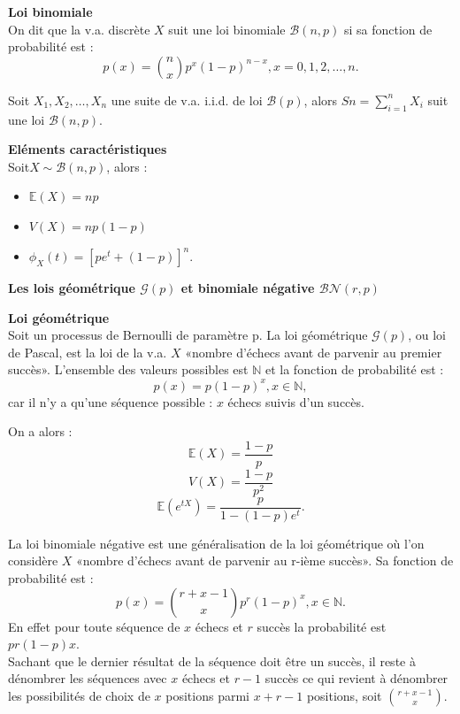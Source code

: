 \documentclass[../PolyS4.tex]{subfiles}
\begin{document}
\begin{Def}\textbf{Loi binomiale}\\
 On dit que la v.a. discrète $X$ suit une loi binomiale $\mathcal{B}(n, p)$ si
sa fonction de probabilité est :$$
p(x) =
\binom{n}{x}p^x(1 -p)^{n-x} , x = 0, 1, 2, \dots, n .$$
\end{Def}

\begin{Prop}

 Soit $X_1,X_2,\dots ,X_n$ une suite de v.a. i.i.d. de loi $\mathcal{B}(p)$, alors
$Sn =\sum_{i=1}^n X_i$ suit une loi $\mathcal{B}(n, p)$.
\end{Prop}




\begin{Prop}\textbf{Eléments caractéristiques}\\

Soit$ X \sim \mathcal{ B}(n, p)$, alors :\\
\begin{itemize}
\item $\mathbb{E}(X) = np$
\item $V (X) = np(1 - p)$
\item $\phi_X(t) = [pe^t + (1 - p)]^n.$
\end{itemize}

\end{Prop}



\textbf{ Les lois g\' eom\' etrique $\mathcal{G}(p)$ et binomiale n\' egative $\mathcal{BN}(r,p)$}

\begin{Def}\textbf{Loi géométrique}\\
Soit un processus de Bernoulli de paramètre p. La loi géométrique $\mathcal{G}(p)$, ou loi de Pascal, est la loi de la v.a. $X$ «nombre d'échecs avant de parvenir au premier succès». L'ensemble des valeurs possibles est $\mathbb{N}$ et la fonction de probabilité est :
$$p(x) = p(1 - p)^x, x \in \mathbb{N} ,$$
car il n'y a qu'une séquence possible : $x$ échecs suivis d'un succès.\\
\end{Def}
\begin{Prop}
On a alors :
$$\mathbb{E}(X) =\dfrac{1- p}{p}$$
$$V (X) =\dfrac{1 - p}{p^2}$$
$$\mathbb{E}(e^{tX}) =\dfrac{p}{1 - (1 - p)e^t}
.$$
\end{Prop}

La loi binomiale négative est une généralisation de la loi géométrique où l'on considère $X$ «nombre d'échecs avant de parvenir au r-ième succès». Sa fonction de probabilité est :
$$p(x) =\binom{r + x - 1}{x}p^r(1 - p)^x, x \in \mathbb{ N}.$$
En effet pour toute séquence de $x$ échecs et $r$ succès la probabilité est $pr(1-p)x$.\\
Sachant que le dernier résultat de la séquence doit être un succès, il reste à dénombrer les séquences avec $x$ échecs et $r-1$ succès ce qui revient à dénombrer les possibilités de choix de $x$ positions parmi $x + r - 1$ positions, soit
$\binom{r+x-1}{ x}$.
\end{document}
